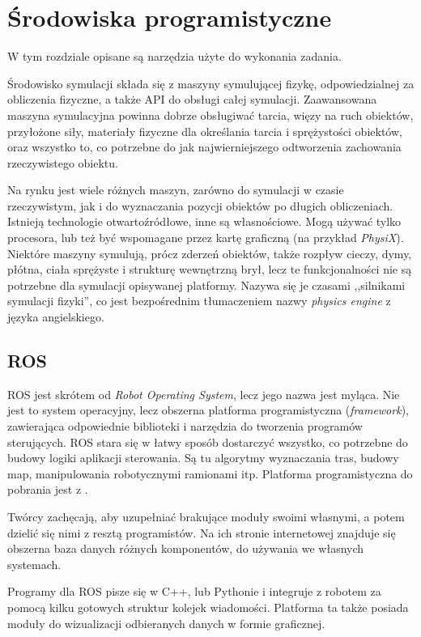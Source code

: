 \chapter{Środowiska programistyczne} 
\label{sec:tools}
W tym rozdziale opisane są narzędzia użyte do wykonania zadania.

Środowisko symulacji składa się z maszyny symulującej fizykę, odpowiedzialnej za obliczenia fizyczne, a także API do obsługi całej symulacji.
Zaawansowana maszyna symulacyjna powinna dobrze obsługiwać tarcia, więzy na ruch obiektów, przyłożone siły, materiały fizyczne dla określania tarcia i sprężystości obiektów, 
oraz wszystko to, co potrzebne do jak najwierniejszego odtworzenia zachowania rzeczywistego obiektu.

Na rynku jest wiele różnych maszyn, zarówno do symulacji w czasie rzeczywistym, jak i do wyznaczania pozycji obiektów po długich obliczeniach.
Istnieją technologie otwartoźródłowe, inne są własnościowe. Mogą używać tylko procesora, lub też być wspomagane przez kartę graficzną (na przykład \emph{PhysiX}).
Niektóre maszyny symulują, prócz zderzeń obiektów, także rozpływ cieczy, dymy, płótna, ciała sprężyste i strukturę wewnętrzną brył, 
lecz te funkcjonalności nie są potrzebne dla symulacji opisywanej platformy. Nazywa się je czasami ,,silnikami symulacji fizyki'', co jest bezpośrednim tłumaczeniem nazwy
\emph{physics engine} z języka angielskiego.

\section{ROS}
	ROS jest skrótem od \emph{Robot Operating System}, lecz jego nazwa jest myląca.
	Nie jest to system operacyjny, lecz obszerna platforma programistyczna (\emph{framework}), zawierająca odpowiednie biblioteki i narzędzia do tworzenia programów sterujących.
	ROS stara się w łatwy sposób dostarczyć wszystko, co potrzebne do budowy logiki aplikacji sterowania.
	Są tu algorytmy wyznaczania tras, budowy map, manipulowania robotycznymi ramionami itp. 
	Platforma programistyczna do pobrania jest z \cite{ros_website}.

	Twórcy zachęcają, aby uzupełniać brakujące moduły swoimi własnymi, a potem dzielić się nimi z resztą programistów.
	Na ich stronie internetowej znajduje się obszerna baza danych różnych komponentów, do używania we własnych systemach.

	Programy dla ROS pisze się w C++, lub Pythonie i integruje z robotem za pomocą kilku gotowych struktur kolejek wiadomości.
	Platforma ta także posiada moduły do wizualizacji odbieranych danych w formie graficznej.

